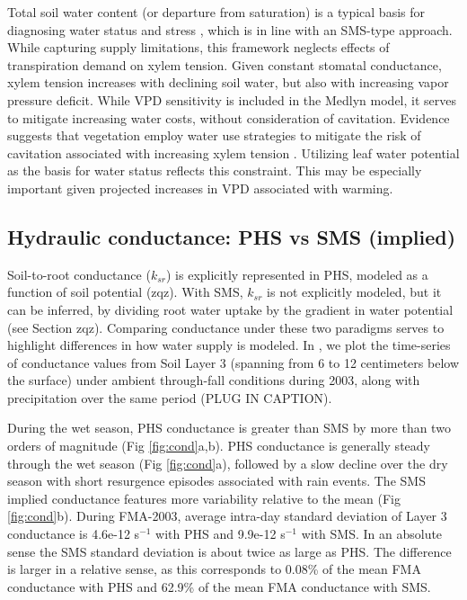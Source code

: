 \documentclass[draft,linenumbers]{agujournal}
\begin{document}
    Total soil water content (or departure from saturation) is a typical basis for diagnosing water status and stress \citep{drake2017}, which is in line with an SMS-type approach.
    While capturing supply limitations, this framework neglects effects of transpiration demand on xylem tension.
    Given constant stomatal conductance, xylem tension increases with declining soil water, but also with increasing vapor pressure deficit.
    While VPD sensitivity is included in the Medlyn model, it serves to mitigate increasing water costs, without consideration of cavitation.
    Evidence suggests that vegetation employ water use strategies to mitigate the risk of cavitation associated with increasing xylem tension \citep{sperry1998,fisher2006,choat2012}.
    Utilizing leaf water potential as the basis for water status reflects this constraint.
    This may be especially important given projected increases in VPD associated with warming.

\subsection{Hydraulic conductance: PHS vs SMS (implied)}

\label{sect:cond}
    
    Soil-to-root conductance ($k_{sr}$) is explicitly represented in PHS, modeled as a function of soil potential (zqz). With SMS, $k_{sr}$ is not explicitly modeled, but it can be inferred, by dividing root water uptake by the gradient in water potential (see Section zqz). Comparing conductance under these two paradigms serves to highlight differences in how water supply is modeled. In , we plot the time-series of conductance values from Soil Layer 3 (spanning from 6 to 12 centimeters below the surface) under ambient through-fall conditions during 2003, along with precipitation over the same period (PLUG IN CAPTION).
    
    During the wet season, PHS conductance is greater than SMS by more than two orders of magnitude (Fig \ref{fig:cond}a,b). PHS conductance is generally steady through the wet season (Fig \ref{fig:cond}a), followed by a slow decline over the dry season with short resurgence episodes associated with rain events. The SMS implied conductance features more variability relative to the mean (Fig \ref{fig:cond}b). During FMA-2003, average intra-day standard deviation of Layer 3 conductance is 4.6e-12 s$^{-1}$ with PHS and 9.9e-12 s$^{-1}$ with SMS. In an absolute sense the SMS standard deviation is about twice as large as PHS. The difference is larger in a relative sense, as this corresponds to 0.08\% of the mean FMA conductance with PHS and 62.9\% of the mean FMA conductance with SMS.
    
\end{document}
